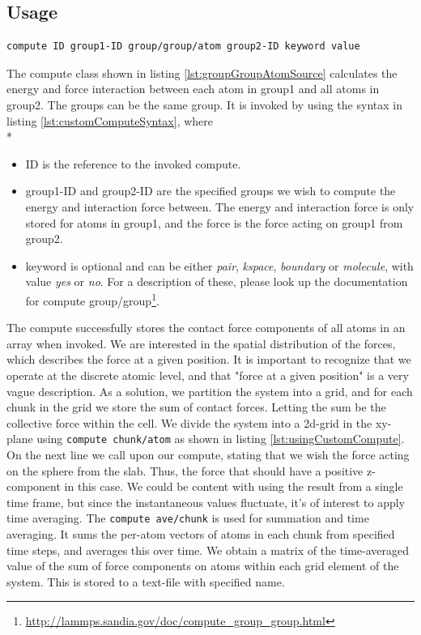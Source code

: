 \documentclass[twoside,english]{uiofysmaster}
\begin{document}
\subsection{Usage}

 \begin{lstlisting}[language=LammpsInput, caption={Syntax for using custom compute}, label={lst:customComputeSyntax} ]
	compute ID group1-ID group/group/atom group2-ID keyword value
\end{lstlisting}
The compute class shown in listing \ref{lst:groupGroupAtomSource} calculates the energy and force interaction between each atom in group1 and all atoms in group2. The groups can be the same group. It is invoked by using the syntax in listing \ref{lst:customComputeSyntax},
where \\*
\begin{itemize}
	\item ID is the reference to the invoked compute.
	\item group1-ID and group2-ID are the specified groups we wish to compute the energy and interaction force between. The energy and interaction force is only stored for atoms in group1, and the force is the force acting on group1 from group2.
	\item keyword is optional and can be either \textit{pair}, \textit{kspace}, \textit{boundary} or \textit{molecule}, with value \textit{yes} or \textit{no}. For a description of these, please look up the documentation for compute group/group\footnote{\href{http://lammps.sandia.gov/doc/compute_group_group.html}{\url{http://lammps.sandia.gov/doc/compute_group_group.html}}}. 
\end{itemize}
The compute successfully stores the contact force components of all atoms in an array when invoked. 
We are interested in the spatial distribution of the forces, which describes the force at a given position. 
It is important to recognize that we operate at the discrete atomic level, and that "force at a given position" is a very vague description. 
As a solution, we partition the system into a grid, and for each chunk in the grid we store the sum of contact forces. Letting the sum be the collective force within the cell.
We divide the system into a 2d-grid in the xy-plane using  \texttt{compute chunk/atom} as shown in listing \ref{lst:usingCustomCompute}.
On the next line we call upon our compute, stating that we wish the force acting on the sphere from the slab. 
Thus, the force that should have a positive z-component in this case. 
We could be content with using the result from a single time frame, but since the instantaneous values fluctuate, it's of interest to apply time averaging. 
The \texttt{compute ave/chunk} is used for summation and time averaging.  
It sums the  per-atom vectors of atoms in each chunk from specified time steps, and averages this over time. 
We obtain a matrix of the time-averaged value of the sum of force components on atoms within each grid element of the system.
This is stored to a text-file with specified name. 
\end{document}
